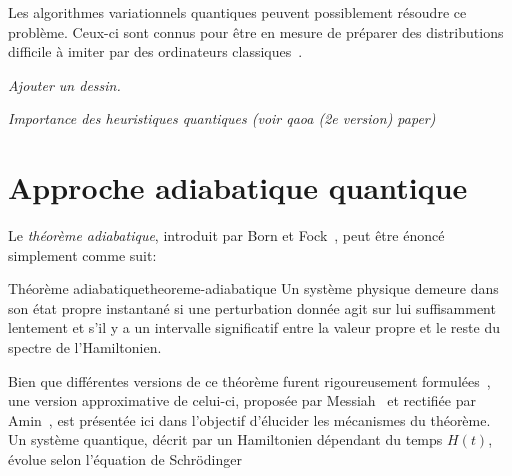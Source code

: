 Les algorithmes variationnels quantiques peuvent possiblement résoudre ce problème. Ceux-ci sont connus pour être en mesure de préparer des distributions difficile à imiter par des ordinateurs classiques~\cite{aaronsonComputationalComplexityLinear2011a, boulandComplexityVerificationQuantum2019}.

\textcolor{mydarkred}{\textit{Ajouter un dessin.}}

\textcolor{mydarkred}{\textit{Importance des heuristiques quantiques (voir qaoa (2e version) paper)}}


\section{Approche adiabatique quantique}

Le \textit{théorème adiabatique}, introduit par Born et Fock~\cite{bornBeweisAdiabatensatzes1928}, peut être énoncé simplement comme suit:

\begin{subtheorem}{Théorème adiabatique}{theoreme-adiabatique}
    Un système physique demeure dans son état propre instantané si une perturbation donnée agit sur lui suffisamment lentement et s'il y a un intervalle significatif entre la valeur propre et le reste du spectre de l'Hamiltonien.
\end{subtheorem}

Bien que différentes versions de ce théorème furent rigoureusement formulées~\cite{albashAdiabaticQuantumComputing2018}, une version approximative de celui-ci, proposée par Messiah~\cite{messiahQuantumMechanics1999} et rectifiée par Amin~\cite{aminConsistencyAdiabaticTheorem2009}, est présentée ici dans l'objectif d'élucider les mécanismes du théorème. Un système quantique, décrit par un Hamiltonien dépendant du temps $H(t)$, évolue selon l'équation de Schrödinger

